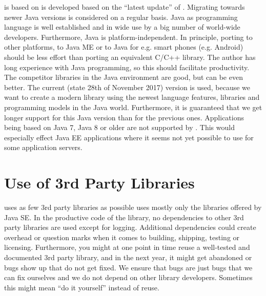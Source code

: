 {%
\LibName{} is based on \JavaVersion{}%
}
{%
\LibName{} is developed based on the ``latest update'' of \JavaVersion{}. Migrating \LibName{} towards newer Java versions is considered on a regular basis.
}
{%
Java as programming language is well established and in wide use by a big number of world-wide developers. Furthermore, Java is platform-independent. In principle, porting \LibName{} to other platforms, to Java ME or to Java for  e.g. smart phones (e.g. Android) should be less effort than porting an equivalent C/C++ library. The author has long experience with Java programming, so this should facilitate productivity. The competitor libraries in the Java environment are good, but \LibName{} can be even better. The current (state 28th of November 2017) version \JavaVersion{} is used, because we want to create a modern library using the newest language features, libraries and programming models in the Java world. Furthermore, it is guaranteed that we get longer support for this Java version than for the previous ones.
}
{%
Applications being based on Java 7, Java 8 or older are not supported by \LibName{}. This would especially effect Java EE applications where it seems not yet possible to use \JavaVersion{} for some application servers.
}


\section{Use of 3rd Party Libraries}
\label{sec:VerwendungAndLib}

{%
\LibName{} uses as few 3rd party libraries as possible
}
{%
\LibName{} uses mostly only the libraries offered by Java SE. In the productive code of the library, no dependencies to other 3rd party libraries are used except for logging.
}
{%
Additional dependencies could create overhead or question marks when it comes to building, shipping, testing or licensing. Furthermore, you might at one point in time reuse a well-tested and documented 3rd party library, and in the next year, it might get abandoned or bugs show up that do not get fixed. We ensure that bugs are just bugs that we can fix ourselves and we do not depend on other library developers.
}
{%
Sometimes this might mean ``do it yourself'' instead of reuse.
}


